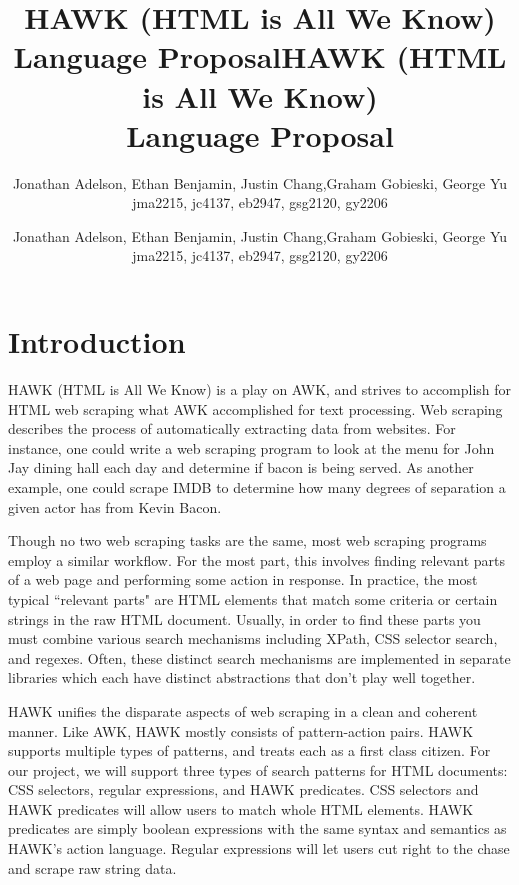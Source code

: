 \documentclass[12pt]{article}
\title{HAWK (HTML is All We Know)\\
Language Proposal}
\author{Jonathan Adelson, Ethan Benjamin, Justin Chang,Graham Gobieski, George Yu\\
jma2215, jc4137, eb2947, gsg2120, gy2206}
\date{}
\newcommand{\setdocdata}{
\title{HAWK (HTML is All We Know)\\
Language Proposal}
\author{Jonathan Adelson, Ethan Benjamin, Justin Chang,Graham Gobieski, George Yu\\
jma2215, jc4137, eb2947, gsg2120, gy2206}
\date{}
}
\begin{document}


\setdocdata
\maketitle

\section*{Introduction}

	HAWK (HTML is All We Know) is a play on AWK, and strives to accomplish for HTML web scraping what AWK accomplished for text processing. Web scraping describes the process of automatically extracting data from websites. For instance, one could write a web scraping program to look at the menu for John Jay dining hall each day and determine if bacon is being served. As another example, one could scrape IMDB to determine how many degrees of separation a given actor has from Kevin Bacon.

	Though no two web scraping tasks are the same, most web scraping programs employ a similar workflow. For the most part, this involves finding relevant parts of a web page and performing some action in response. In practice, the most typical ``relevant parts" are HTML elements that match some criteria or certain strings in the raw HTML document. Usually, in order to find these parts you must combine various search mechanisms including XPath, CSS selector search, and regexes. Often, these distinct search mechanisms are implemented in separate libraries which each have distinct abstractions that don't play well together.

	HAWK unifies the disparate aspects of web scraping in a clean and coherent manner. Like AWK, HAWK mostly consists of pattern-action pairs. HAWK supports multiple types of patterns, and treats each as a first class citizen. For our project, we will support three types of search patterns for HTML documents: CSS selectors, regular expressions, and HAWK predicates. CSS selectors and HAWK predicates will allow users to match whole HTML elements. HAWK predicates are simply boolean expressions with the same syntax and semantics as HAWK's action language. Regular expressions will let users cut right to the chase and scrape raw string data.
\end{document}
